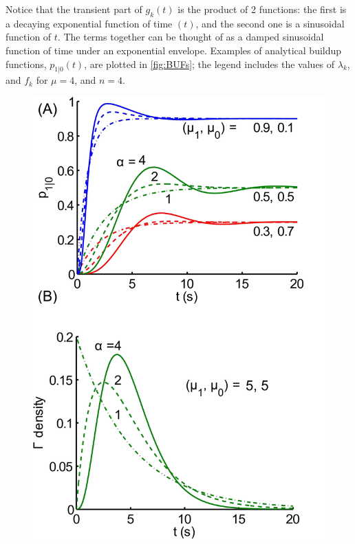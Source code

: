 Notice that the transient part of $g_k(t)$ is the product of 2 functions: the first is a decaying exponential function of time $(t)$, and the second one is a sinusoidal function of $t$. The terms together can be thought of as a damped sinusoidal function of time under an exponential envelope. Examples of analytical buildup functions, $p_{1|0}(t)$, are plotted in \ref{fig:BUFs}; the legend includes the values of $\lambda_k$, and $f_k$ for $\mu=4$, and $n=4$.

\begin{figure}
	\centering
	\includegraphics[scale=.9]{ch2Figs/3-analyticbufs_gams.jpg}

\end{figure}
